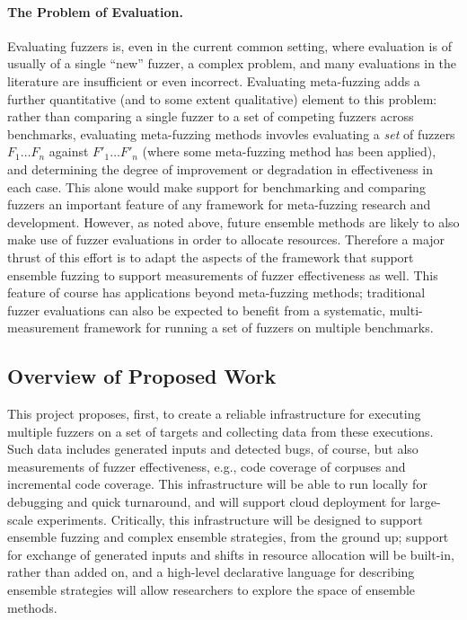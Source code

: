 \documentclass[numbers]{proposalnsf}
\begin{document}
\paragraph{The Problem of Evaluation.} Evaluating fuzzers is, even in the current common setting, where evaluation is of usually of a single ``new'' fuzzer, a complex problem, and many evaluations in the literature are insufficient or even incorrect.  Evaluating meta-fuzzing adds a further quantitative (and to some extent qualitative) element to this problem: rather than comparing a single fuzzer to a set of competing fuzzers across benchmarks, evaluating meta-fuzzing methods invovles evaluating a \emph{set} of fuzzers $F_1 \ldots F_n$ against $F'_1 \ldots F'_n$ (where some meta-fuzzing method has been applied), and determining the degree of improvement or degradation in effectiveness in each case.  This alone would make support for benchmarking and comparing fuzzers an important feature of any framework for meta-fuzzing research and development.  However, as noted above, future ensemble methods are likely to also make use of fuzzer evaluations in order to allocate resources.  Therefore a major thrust of this effort is to adapt the aspects of the framework that support ensemble fuzzing to support measurements of fuzzer effectiveness as well.  This feature of course has applications beyond meta-fuzzing methods; traditional fuzzer evaluations can also be expected to benefit from a systematic, multi-measurement framework for running a set of fuzzers on multiple benchmarks.

\subsection{Overview of Proposed Work}

This project proposes, first, to create a reliable infrastructure for executing multiple fuzzers on a set of targets and collecting data from these executions.  Such data includes generated inputs and detected bugs, of course, but also measurements of fuzzer effectiveness, e.g., code coverage of corpuses and incremental code coverage.  This infrastructure will be able to run locally for debugging and quick turnaround, and will support cloud deployment for large-scale experiments. Critically, this infrastructure will be designed to support ensemble fuzzing and complex ensemble strategies, from the ground up; support for exchange of generated inputs and shifts in resource allocation will be built-in, rather than added on, and a high-level declarative language for describing ensemble strategies will allow researchers to explore the space of ensemble methods.
\end{document}
